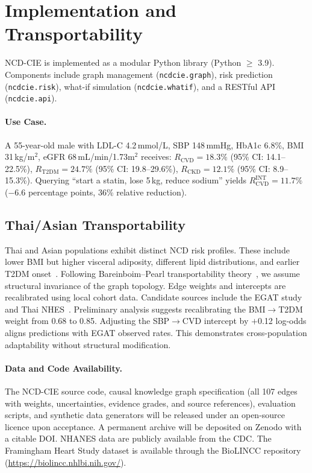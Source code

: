 \documentclass[runningheads]{llncs}
\begin{document}
\section{Implementation and Transportability}\label{sec:impl}

NCD-CIE is implemented as a modular Python library (Python $\geq$
3.9).
Components include graph management (\texttt{ncdcie.graph}),
risk prediction (\texttt{ncdcie.risk}), what-if simulation
(\texttt{ncdcie.whatif}), and a RESTful API (\texttt{ncdcie.api}).

\paragraph{Use Case.}
A 55-year-old male with LDL-C 4.2\,mmol/L, SBP 148\,mmHg, HbA1c
6.8\%, BMI 31\,kg/m$^2$, eGFR 68\,mL/min/1.73m$^2$ receives:
$R_{\text{CVD}} = 18.3\%$ (95\% CI: 14.1--22.5\%),
$R_{\text{T2DM}} = 24.7\%$ (95\% CI: 19.8--29.6\%),
$R_{\text{CKD}} = 12.1\%$ (95\% CI: 8.9--15.3\%).
Querying ``start a statin, lose 5\,kg, reduce sodium'' yields
$R_{\text{CVD}}^{\text{INT}} = 11.7\%$ ($-$6.6 percentage points,
36\% relative reduction).

\subsection{Thai/Asian Transportability}\label{sec:thai}

Thai and Asian populations exhibit distinct NCD risk profiles.
These include lower BMI but higher visceral adiposity, different lipid
distributions, and earlier T2DM
onset~\cite{aekplakorn2011thai}.
Following Bareinboim--Pearl transportability
theory~\cite{bareinboim2016causal}, we assume structural invariance
of the graph topology.
Edge weights and intercepts are recalibrated using local cohort data.
Candidate sources include the EGAT
study~\cite{sritara2003egat} and Thai NHES~\cite{aekplakorn2011thai}.
Preliminary analysis suggests recalibrating the BMI$\rightarrow$T2DM
weight from 0.68 to 0.85.
Adjusting the SBP$\rightarrow$CVD intercept by $+$0.12 log-odds
aligns predictions with EGAT observed rates.
This demonstrates cross-population adaptability without structural
modification.

\paragraph{Data and Code Availability.}
The NCD-CIE source code, causal knowledge graph specification
(all 107 edges with weights, uncertainties, evidence grades, and
source references), evaluation scripts, and synthetic data generators
will be released under an open-source licence upon acceptance.
A permanent archive will be deposited on Zenodo with a citable DOI\@.
NHANES data are publicly available from the CDC\@.
The Framingham Heart Study dataset is available through the BioLINCC
repository (\url{https://biolincc.nhlbi.nih.gov/}).
\end{document}
